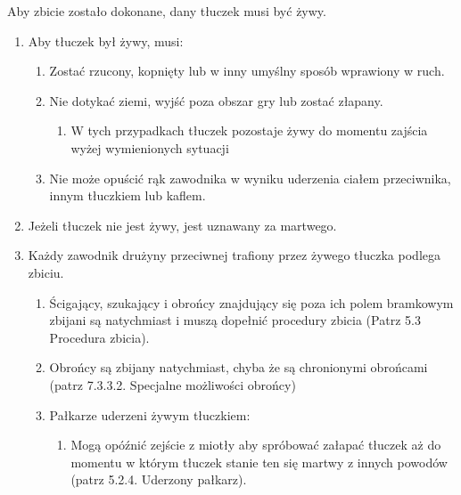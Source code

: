 \documentclass[12pt]{article}
\begin{document}
Aby zbicie zostało dokonane, dany tłuczek musi być żywy.

\begin{enumerate}
	\item
	      Aby tłuczek był żywy, musi:

	      \begin{enumerate}
		      \item
		            Zostać rzucony, kopnięty lub w inny umyślny sposób wprawiony w ruch.
		      \item
		            Nie dotykać ziemi, wyjść poza obszar gry lub zostać złapany.

		            \begin{enumerate}
			            \item
			                  W tych przypadkach tłuczek pozostaje żywy do momentu zajścia wyżej
			                  wymienionych sytuacji
		            \end{enumerate}
		      \item
		            Nie może opuścić rąk zawodnika w wyniku uderzenia ciałem
		            przeciwnika, innym tłuczkiem lub kaflem.
	      \end{enumerate}
	\item
	      Jeżeli tłuczek nie jest żywy, jest uznawany za martwego.
	\item
	      Każdy zawodnik drużyny przeciwnej trafiony przez żywego tłuczka
	      podlega zbiciu.

	      \begin{enumerate}
		      \item
		            Ścigający, szukający i obrońcy znajdujący się poza ich polem
		            bramkowym zbijani są natychmiast i muszą dopełnić procedury zbicia
		            (Patrz 5.3 Procedura zbicia).
		      \item
		            Obrońcy są zbijany natychmiast, chyba że są chronionymi obrońcami
		            (patrz 7.3.3.2. Specjalne możliwości obrońcy)
		      \item
		            Pałkarze uderzeni żywym tłuczkiem:

		            \begin{enumerate}
			            \item
			                  Mogą opóźnić zejście z miotły aby spróbować załapać tłuczek aż do
			                  momentu w którym tłuczek stanie ten się martwy z innych powodów
			                  (patrz 5.2.4. Uderzony pałkarz).


\end{enumerate}
\end{enumerate}
\end{enumerate}
\end{document}
